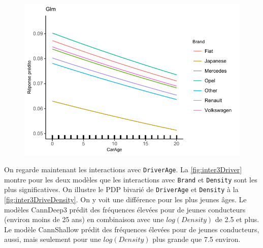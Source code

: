 \begin{figure}
\begin{minipage}{0.45\linewidth}
\end{minipage}
\hfill
\begin{minipage}{0.45\linewidth}
\includegraphics[scale=0.6]{Graphiques/interBrandCarGlm}
\end{minipage}
\end{figure}

On regarde maintenant les interactions avec \verb=DriverAge=. La \autoref{fig:inter3Driver} montre pour les deux modèles que les interactions avec \verb=Brand= et \verb=Density= sont les plus significatives. On illustre le PDP bivarié de \verb=DriverAge= et \verb=Density= à la \autoref{fig:inter3DriveDensity}. On y voit une différence pour les plus jeunes âges. Le modèles CannDeep3 prédit des fréquences élevées pour de jeunes conducteurs (environ moins de 25 ans) en combinaison avec une $log(Density)$ de 2.5 et plus. Le modèle CannShallow prédit des fréquences élevées pour de jeunes conducteurs, aussi, mais seulement pour une $log(Density)$ plus grande que 7.5 environ.

